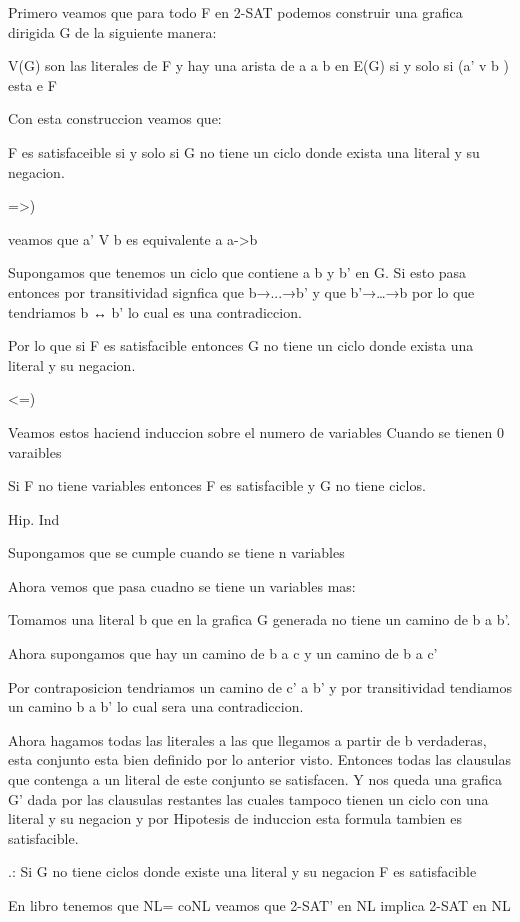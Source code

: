 \documentclass[12pt]{article}
\begin{document}
Primero veamos que para todo F en 2-SAT podemos construir una grafica dirigida G de la siguiente manera:

	V(G) son las literales de F y hay una arista de a a b en E(G) si y solo si (a’ v b ) esta e F 

Con esta construccion veamos que:

	 F es satisfaceible si y solo si G no tiene un ciclo donde exista una literal y su negacion.

=>)

veamos que a’ V b es equivalente a a->b

Supongamos que tenemos un ciclo que contiene a b y b’ en G. 
Si esto pasa entonces por transitividad signfica que b→...→b’ y que b’→…→b por lo que tendriamos  b ↔ b’ lo cual es una contradiccion.

Por lo que si F es satisfacible entonces G no tiene un ciclo donde exista una literal y su negacion.

<=)

Veamos estos haciend induccion sobre el numero de variables 
Cuando se tienen 0 varaibles

Si F no tiene variables entonces F es satisfacible y G no tiene ciclos.

Hip. Ind

Supongamos que se cumple cuando se tiene n variables

Ahora vemos que pasa cuadno se tiene un variables mas:

Tomamos una literal b que en la grafica G generada no tiene un camino de b a b’.

Ahora supongamos que hay un camino de b a c y un camino de b a c’

Por contraposicion tendriamos un camino de c’ a b’ y por transitividad tendiamos un camino  b a b’ lo cual sera una contradiccion.

Ahora hagamos todas las literales  a las que llegamos a partir de b verdaderas, esta conjunto esta bien definido por lo anterior visto. Entonces todas las clausulas que contenga a un literal de este conjunto se satisfacen. Y nos queda una grafica G’ dada por las clausulas restantes las cuales tampoco tienen un ciclo con una literal y su negacion y por Hipotesis de induccion esta formula tambien es satisfacible.

.: Si G no tiene ciclos donde existe una literal y su negacion F es satisfacible




En libro tenemos que NL= coNL veamos que 2-SAT’ en NL implica 2-SAT en NL
\end{document}
